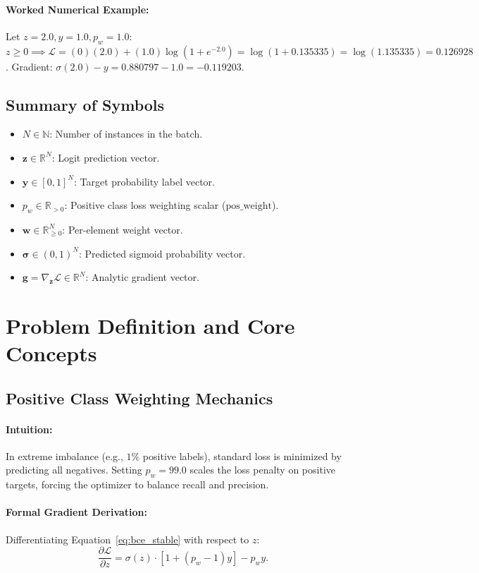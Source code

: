 \documentclass[11pt]{article}
\begin{document}
\paragraph{Worked Numerical Example:}
Let $z = 2.0, y = 1.0, p_w = 1.0$:
$z \ge 0 \implies \mathcal{L} = (0)(2.0) + (1.0)\log(1 + e^{-2.0}) = \log(1 + 0.135335) = \log(1.135335) = 0.126928$.
Gradient: $\sigma(2.0) - y = 0.880797 - 1.0 = -0.119203$.

\subsection{Summary of Symbols}
\begin{itemize}
    \item $N \in \mathbb{N}$: Number of instances in the batch.
    \item $\mathbf{z} \in \mathbb{R}^N$: Logit prediction vector.
    \item $\mathbf{y} \in [0, 1]^N$: Target probability label vector.
    \item $p_w \in \mathbb{R}_{>0}$: Positive class loss weighting scalar ($\mathrm{pos\_weight}$).
    \item $\mathbf{w} \in \mathbb{R}_{\ge 0}^N$: Per-element weight vector.
    \item $\boldsymbol{\sigma} \in (0, 1)^N$: Predicted sigmoid probability vector.
    \item $\mathbf{g} = \nabla_{\mathbf{z}} \mathcal{L} \in \mathbb{R}^N$: Analytic gradient vector.
\end{itemize}

\section{Problem Definition and Core Concepts}
\label{sec:problem_definition}

\subsection{Positive Class Weighting Mechanics}
\paragraph{Intuition:} In extreme imbalance (e.g., $1\%$ positive labels), standard loss is minimized by predicting all negatives. Setting $p_w = 99.0$ scales the loss penalty on positive targets, forcing the optimizer to balance recall and precision.

\paragraph{Formal Gradient Derivation:}
Differentiating Equation~\eqref{eq:bce_stable} with respect to $z$:
\begin{equation}
\frac{\partial \mathcal{L}}{\partial z} = \sigma(z) \cdot \left[ 1 + (p_w - 1)y \right] - p_w y.
\end{equation}
\end{document}
